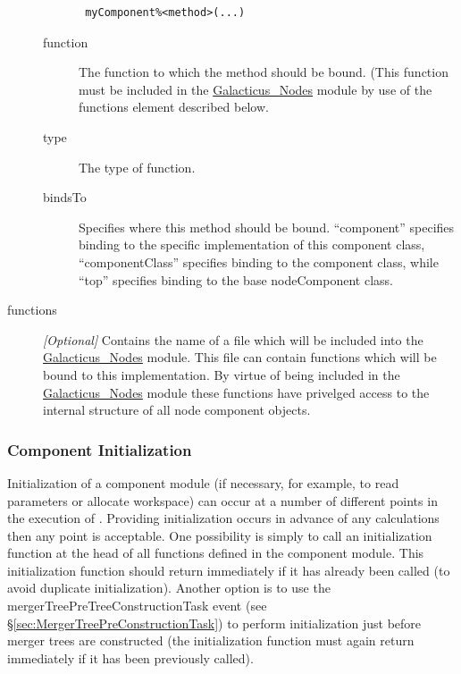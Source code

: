 \begin{description}
\begin{description}
\begin{verbatim}
 myComponent%<method>(...)
\end{verbatim}
\item [{\normalfont \ttfamily function}] The function to which the method should be bound. (This function must be included in the \hyperlink{objects.nodes.F90:galacticus_nodes}{\normalfont \ttfamily Galacticus\_Nodes} module by use of the {\normalfont \ttfamily functions} element described below.
\item [{\normalfont \ttfamily type}] The type of function.
\item [{\normalfont \ttfamily bindsTo}] Specifies where this method should be bound. ``{\normalfont \ttfamily component}'' specifies binding to the specific implementation of this component class, ``{\normalfont \ttfamily componentClass}'' specifies binding to the component class, while ``{\normalfont \ttfamily top}'' specifies binding to the base {\normalfont \ttfamily nodeComponent} class.
\end{description}
\item [{\normalfont \ttfamily functions}] \emph{[Optional]} Contains the name of a file which will be included into the \hyperlink{objects.nodes.F90:galacticus_nodes}{\normalfont \ttfamily Galacticus\_Nodes} module. This file can contain functions which will be bound to this implementation. By virtue of being included in the \hyperlink{objects.nodes.F90:galacticus_nodes}{\normalfont \ttfamily Galacticus\_Nodes} module these functions have privelged access to the internal structure of all node component objects.
\end{description}

\subsubsection{Component Initialization}

Initialization of a component module (if necessary, for example, to read parameters or allocate workspace) can occur at a number of different points in the execution of \glc. Providing initialization occurs in advance of any calculations then any point is acceptable. One possibility is simply to call an initialization function at the head of all functions defined in the component module. This initialization function should return immediately if it has already been called (to avoid duplicate initialization). Another option is to use the {\normalfont \ttfamily mergerTreePreTreeConstructionTask} event (see \S\ref{sec:MergerTreePreConstructionTask}) to perform initialization just before merger trees are constructed (the initialization function must again return immediately if it has been previously called).


